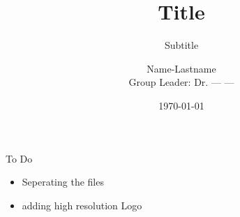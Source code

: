 \documentclass{beamer}
\title{{\color{mpi-green}Title}}
\subtitle{{\color{mpi-green}Subtitle}}
\author{Name-Lastname \\ Group Leader: Dr. --- ---}
\institute{Max Planck Institute for Polymer research}
\date{\today}
\begin{document}
	\begin{frame}
	    \titlepage
	\end{frame}
	
	
	
	
	\begin{frame}{To Do}
	    \begin{itemize}
	    	\item Seperating the files
	    	\item adding high resolution Logo
	    \end{itemize}
	\end{frame}
\end{document}
